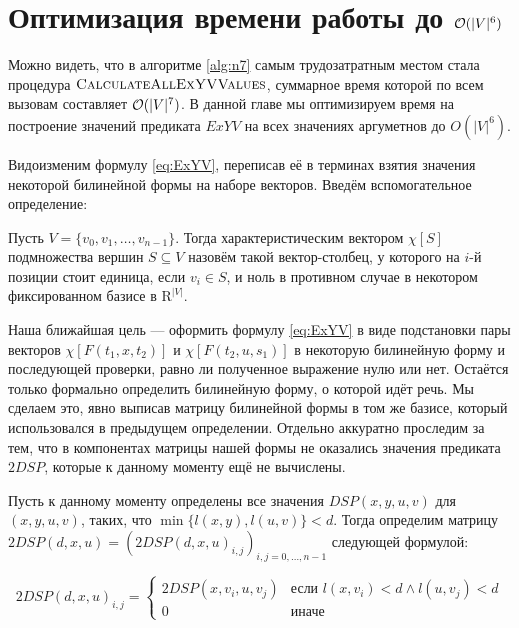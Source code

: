 \chapter{Оптимизация времени работы до $\mathcal{O}(|V|^6)$}

Можно видеть, что в алгоритме \ref{alg:n7} самым трудозатратным местом стала процедура $\textsc{CalculateAllExYVValues}$, суммарное время которой по всем вызовам составляет $\mathcal{O}(|V|^7)$. В данной главе мы оптимизируем время на построение значений предиката $ExYV$ на всех значениях аргуметнов до $O(|V|^6)$.

Видоизменим формулу \eqref{eq:ExYV}, переписав её в терминах взятия значения некоторой билинейной формы на наборе векторов. Введём вспомогательное определение:

\begin{definition}
Пусть $V = \{v_0, v_1, \ldots, v_{n-1}\}$. Тогда характеристическим вектором $\chi[S]$ подмножества вершин $S \subseteq V$ назовём такой вектор-столбец, у которого на $i$-й позиции стоит единица, если $v_i \in S$, и ноль в противном случае в некотором фиксированном базисе в $\mathrm{R}^|V|$.
\end{definition}

Наша ближайшая цель --- оформить формулу \eqref{eq:ExYV} в виде подстановки пары векторов $\chi[F(t_1, x, t_2)]$ и $\chi[F(t_2, u, s_1)]$ в некоторую билинейную форму и последующей проверки, равно ли полученное выражение нулю или нет. Остаётся только формально определить билинейную форму, о которой идёт речь. Мы сделаем это, явно выписав матрицу билинейной формы в том же базисе, который использовался в предыдущем определении. Отдельно аккуратно проследим за тем, что в компонентах матрицы нашей формы не оказались значения предиката $2DSP$, которые к данному моменту ещё не вычислены.

\begin{definition}
Пусть к данному моменту определены все значения $DSP(x, y, u, v)$ для $(x, y, u, v)$, таких, что $\min\{l(x, y), l(u, v)\} < d$. Тогда определим матрицу $2DSP(d,x,u) = (2DSP(d,x,u)_{i,j})_{i,j=0,\ldots,n-1}$ следующей формулой:

\begin{equation}
2DSP(d,x,u)_{i,j} = \begin{cases}
    2DSP(x,v_i,u,v_j) & \text{если } l(x,v_i) < d \wedge l(u,v_j) < d \\
    0                 & \text{иначе}
\end{cases}
\end{equation}

\end{definition}

